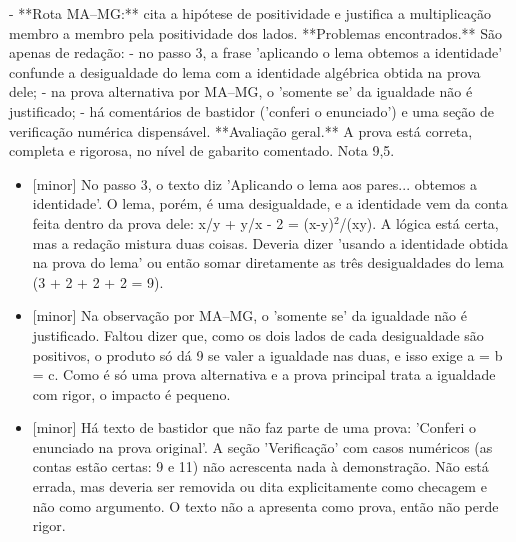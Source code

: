 \documentclass{article}%
\begin{document}
{-} **Rota MA--MG:** cita a hipótese de positividade e justifica a multiplicação membro a membro pela positividade dos lados.\newline%
\newline%
**Problemas encontrados.** São apenas de redação:\newline%
{-} no passo 3, a frase 'aplicando o lema obtemos a identidade' confunde a desigualdade do lema com a identidade algébrica obtida na prova dele;\newline%
{-} na prova alternativa por MA--MG, o 'somente se' da igualdade não é justificado;\newline%
{-} há comentários de bastidor ('conferi o enunciado') e uma seção de verificação numérica dispensável.\newline%
\newline%
**Avaliação geral.** A prova está correta, completa e rigorosa, no nível de gabarito comentado. Nota 9,5.%
\begin{itemize}%
\item%
{[}minor{]} No passo 3, o texto diz 'Aplicando o lema aos pares... obtemos a identidade'. O lema, porém, é uma desigualdade, e a identidade vem da conta feita dentro da prova dele: x/y + y/x - 2 = (x-y)$^2$/(xy). A lógica está certa, mas a redação mistura duas coisas. Deveria dizer 'usando a identidade obtida na prova do lema' ou então somar diretamente as três desigualdades do lema (3 + 2 + 2 + 2 = 9).%
\item%
{[}minor{]} Na observação por MA--MG, o 'somente se' da igualdade não é justificado. Faltou dizer que, como os dois lados de cada desigualdade são positivos, o produto só dá 9 se valer a igualdade nas duas, e isso exige a = b = c. Como é só uma prova alternativa e a prova principal trata a igualdade com rigor, o impacto é pequeno.%
\item%
{[}minor{]} Há texto de bastidor que não faz parte de uma prova: 'Conferi o enunciado na prova original'. A seção 'Verificação' com casos numéricos (as contas estão certas: 9 e 11) não acrescenta nada à demonstração. Não está errada, mas deveria ser removida ou dita explicitamente como checagem e não como argumento. O texto não a apresenta como prova, então não perde rigor.%
\end{itemize}%
\end{document}
